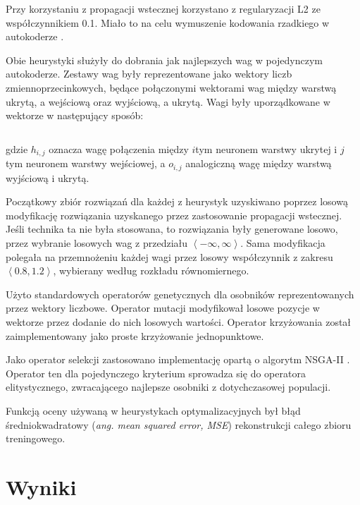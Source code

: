 \documentclass[11pt,a4paper,oneside]{report}
\begin{document}
Przy korzystaniu z propagacji wstecznej korzystano z regularyzacji L2 \cite{girosi1995regularization} ze współczynnikiem 0.1. Miało to na celu wymuszenie kodowania rzadkiego w autokoderze \cite{ngiam2011optimization}.

Obie heurystyki służyły do dobrania jak najlepszych wag w pojedynczym autokoderze. Zestawy wag były reprezentowane jako wektory liczb zmiennoprzecinkowych, będące połączonymi wektorami wag między warstwą ukrytą, a wejściową oraz wyjściową, a ukrytą. Wagi były uporządkowane w wektorze w następujący sposób:

\begin{displaymath}
	[ h_{0, 0}, h_{0, 1}, \ldots, h_{1, 0}, h_{1, 1}, \ldots, o_{0, 0}, o_{0, 1}, \ldots, o_{1, 0}, o_{1, 1}, \ldots ]
\end{displaymath}

gdzie $h_{i, j}$ oznacza wagę połączenia między $i$tym neuronem warstwy ukrytej i $j$tym neuronem warstwy wejściowej, a $o_{i, j}$ analogiczną wagę między warstwą wyjściową i ukrytą.

Początkowy zbiór rozwiązań dla każdej z heurystyk uzyskiwano poprzez losową modyfikację rozwiązania uzyskanego przez zastosowanie propagacji wstecznej. Jeśli technika ta nie była stosowana, to rozwiązania były generowane losowo, przez wybranie losowych wag z przedziału $\left\langle -\infty, \infty \right\rangle $. Sama modyfikacja polegała na przemnożeniu każdej wagi przez losowy współczynnik z zakresu $\left\langle 0.8, 1.2 \right\rangle $, wybierany według rozkładu równomiernego.

Użyto standardowych operatorów genetycznych dla osobników reprezentowanych przez wektory liczbowe. Operator mutacji modyfikował losowe pozycje w wektorze przez dodanie do nich losowych wartości. Operator krzyżowania został zaimplementowany jako proste krzyżowanie jednopunktowe.

Jako operator selekcji zastosowano implementację opartą o algorytm NSGA-II \cite{deb2002fast}. Operator ten dla pojedynczego kryterium sprowadza się do operatora elitystycznego, zwracającego najlepsze osobniki z dotychczasowej populacji.

Funkcją oceny używaną w heurystykach optymalizacyjnych był błąd średniokwadratowy (\textit{ang. mean squared error, MSE}) rekonstrukcji całego zbioru treningowego.

\section{Wyniki}
\end{document}
